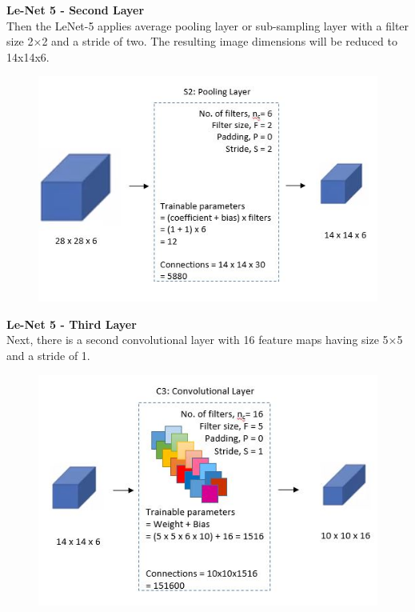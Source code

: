\documentclass[10pt, compress]{beamer}
\begin{document}
\begin{frame}
  \vspace{0.6cm}
  \textbf{Le-Net 5 - Second Layer} \\
  Then the LeNet-5 applies average pooling layer or sub-sampling layer with a filter size 2×2 and a stride of two. The resulting image dimensions will be reduced to 14x14x6.
  \begin{figure}
    \includegraphics[width=.75\linewidth]{imgs/cnn/LeNet_Layer2}
  \end{figure}
\end{frame}

\begin{frame}
  \vspace{0.6cm}
  \textbf{Le-Net 5 - Third Layer} \\
  Next, there is a second convolutional layer with 16 feature maps having size 5×5 and a stride of 1.
  \begin{figure}
    \includegraphics[width=.75\linewidth]{imgs/cnn/LeNet_Layer3}
  \end{figure}
\end{frame}
\end{document}
